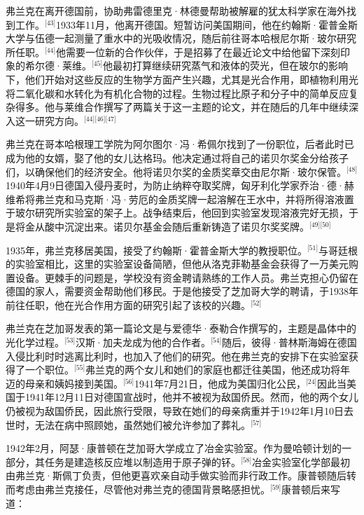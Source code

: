 弗兰克在离开德国前，协助弗雷德里克·林德曼帮助被解雇的犹太科学家在海外找到工作。\(^\text{[43]}\)1933年11月，他离开德国。短暂访问美国期间，他在约翰斯·霍普金斯大学与伍德一起测量了重水中的光吸收情况，随后前往哥本哈根尼尔斯·玻尔研究所任职。\(^\text{[44]}\)他需要一位新的合作伙伴，于是招募了在最近论文中给他留下深刻印象的希尔德·莱维。\(^\text{[45]}\)他最初打算继续研究蒸气和液体的荧光，但在玻尔的影响下，他们开始对这些反应的生物学方面产生兴趣，尤其是光合作用，即植物利用光将二氧化碳和水转化为有机化合物的过程。生物过程比原子和分子中的简单反应复杂得多。他与莱维合作撰写了两篇关于这一主题的论文，并在随后的几年中继续深入这一研究方向。\(^\text{[44][46][47]}\)

弗兰克在哥本哈根理工学院为阿尔图尔·冯·希佩尔找到了一份职位，后者此时已成为他的女婿，娶了他的女儿达格玛。他决定通过将自己的诺贝尔奖金分给孩子们，以确保他们的经济安全。他将诺贝尔奖的金质奖章交由尼尔斯·玻尔保管。\(^\text{[48]}\)1940年4月9日德国入侵丹麦时，为防止纳粹夺取奖牌，匈牙利化学家乔治·德·赫维希将弗兰克和马克斯·冯·劳厄的金质奖牌一起溶解在王水中，并将所得溶液置于玻尔研究所实验室的架子上。战争结束后，他回到实验室发现溶液完好无损，于是将金从酸中沉淀出来。诺贝尔基金会随后重新铸造了诺贝尔奖奖牌。\(^\text{[49][50]}\)

1935年，弗兰克移居美国，接受了约翰斯·霍普金斯大学的教授职位。\(^\text{[51]}\)与哥廷根的实验室相比，这里的实验室设备简陋，但他从洛克菲勒基金会获得了一万美元购置设备。更棘手的问题是，学校没有资金聘请熟练的工作人员。弗兰克担心仍留在德国的家人，需要资金帮助他们移民。于是他接受了芝加哥大学的聘请，于1938年前往任职，他在光合作用方面的研究引起了该校的兴趣。\(^\text{[52]}\)

弗兰克在芝加哥发表的第一篇论文是与爱德华·泰勒合作撰写的，主题是晶体中的光化学过程。\(^\text{[53]}\)汉斯·加夫龙成为他的合作者。\(^\text{[54]}\)随后，彼得·普林斯海姆在德国入侵比利时时逃离比利时，也加入了他们的研究。他在弗兰克的安排下在实验室获得了一个职位。\(^\text{[55]}\)弗兰克的两个女儿和她们的家庭也都迁往美国，他还成功将年迈的母亲和姨妈接到美国。\(^\text{[56]}\)1941年7月21日，他成为美国归化公民，\(^\text{[24]}\)因此当美国于1941年12月11日对德国宣战时，他并不被视为敌国侨民。然而，他的两个女儿仍被视为敌国侨民，因此旅行受限，导致在她们的母亲病重并于1942年1月10日去世时，无法在病中照顾她，虽然她们被允许参加了葬礼。\(^\text{[57]}\)

1942年2月，阿瑟·康普顿在芝加哥大学成立了冶金实验室。作为曼哈顿计划的一部分，其任务是建造核反应堆以制造用于原子弹的钚。\(^\text{[58]}\)冶金实验室化学部最初由弗兰克·斯佩丁负责，但他更喜欢亲自动手做实验而非行政工作。康普顿随后转而考虑由弗兰克接任，尽管他对弗兰克的德国背景略感担忧。\(^\text{[59]}\)康普顿后来写道：

